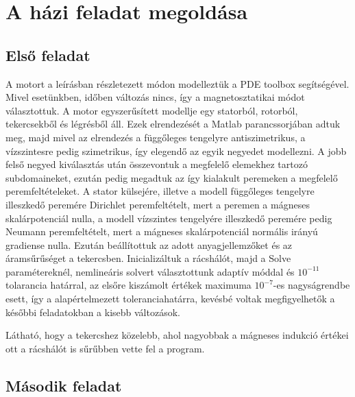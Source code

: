 \chapter{A házi feladat megoldása}
\section{Első feladat}
A motort a leírásban részletezett módon modelleztük a PDE toolbox segítségével. Mivel esetünkben, időben változás nincs, így a magnetosztatikai módot választottuk. A motor egyszerűsített modellje egy statorból, rotorból, tekercsekből és légrésből áll. Ezek elrendezését a Matlab parancssorjában adtuk meg, majd mivel az elrendezés a függőleges tengelyre antiszimetrikus, a vízszintesre pedig szimetrikus, így elegendő az egyik negyedet modellezni. A jobb felső negyed kiválasztás után összevontuk a megfelelő elemekhez tartozó subdomaineket, ezután pedig megadtuk az így kialakult peremeken a megfelelő peremfeltételeket. A stator külsejére, illetve a  modell függőleges tengelyre illeszkedő peremére Dirichlet peremfeltételt, mert a peremen a mágneses skalárpotenciál nulla, a modell vízszintes tengelyére illeszkedő peremére pedig Neumann peremfeltételt, mert a mágneses skalárpotenciál normális irányú gradiense nulla. Ezután beállítottuk az adott anyagjellemzőket és az áramsűrűséget a tekercsben. Inicializáltuk a rácshálót, majd a Solve paramétereknél, nemlineáris solvert választottunk adaptív móddal és $ 10^{-11} $ tolarancia határral, az elsőre kiszámolt értékek maximuma $ 10^{-7} $-es nagyságrendbe esett, így a alapértelmezett toleranciahatárra, kevésbé voltak megfigyelhetők a későbbi feladatokban a kisebb változások. 

Látható, hogy a tekercshez közelebb, ahol nagyobbak a mágneses indukció értékei ott a rácshálót is sűrűbben vette fel a program.



\section{Második feladat}

